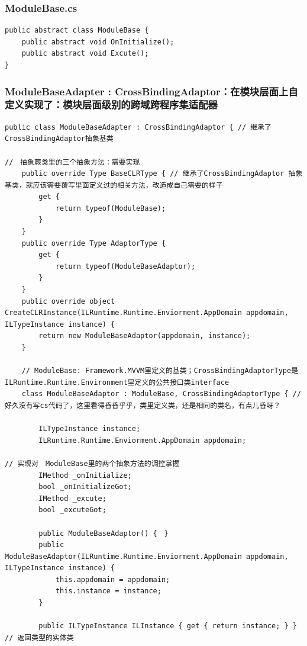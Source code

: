 \documentclass[9pt, b5paper]{article}
\begin{document}
\subsubsection{ModuleBase.cs}
\label{sec-6-3-1}
\begin{verbatim}
public abstract class ModuleBase {
    public abstract void OnInitialize();
    public abstract void Excute();
}
\end{verbatim}
\subsubsection{ModuleBaseAdapter : CrossBindingAdaptor：在模块层面上自定义实现了：模块层面级别的跨域跨程序集适配器}
\label{sec-6-3-2}
\begin{verbatim}
public class ModuleBaseAdapter : CrossBindingAdaptor { // 继承了CrossBindingAdaptor抽象基类

//　抽象蕨类里的三个抽象方法：需要实现　
    public override Type BaseCLRType { // 继承了CrossBindingAdaptor 抽象基类，就应该需要覆写里面定义过的相关方法，改造成自己需要的样子
        get {
            return typeof(ModuleBase);
        }
    }
    public override Type AdaptorType {
        get {
            return typeof(ModuleBaseAdaptor);
        }
    }
    public override object CreateCLRInstance(ILRuntime.Runtime.Enviorment.AppDomain appdomain, ILTypeInstance instance) {
        return new ModuleBaseAdaptor(appdomain, instance);
    }

    // ModuleBase: Framework.MVVM里定义的基类；CrossBindingAdaptorType是ILRuntime.Runtime.Environment里定义的公共接口类interface
    class ModuleBaseAdaptor : ModuleBase, CrossBindingAdaptorType { // 好久没有写cs代码了，这里看得昏昏乎乎，类里定义类，还是相同的类名，有点儿昏呀？

        ILTypeInstance instance;
        ILRuntime.Runtime.Enviorment.AppDomain appdomain;

// 实现对　ModuleBase里的两个抽象方法的调控掌握
        IMethod _onInitialize;
        bool _onInitializeGot;
        IMethod _excute;
        bool _excuteGot;
        
        public ModuleBaseAdaptor() {　}
        public ModuleBaseAdaptor(ILRuntime.Runtime.Enviorment.AppDomain appdomain, ILTypeInstance instance) {
            this.appdomain = appdomain; 
            this.instance = instance;
        }
        
        public ILTypeInstance ILInstance { get { return instance; } } // 返回类型的实体类


\end{verbatim}
\end{document}

